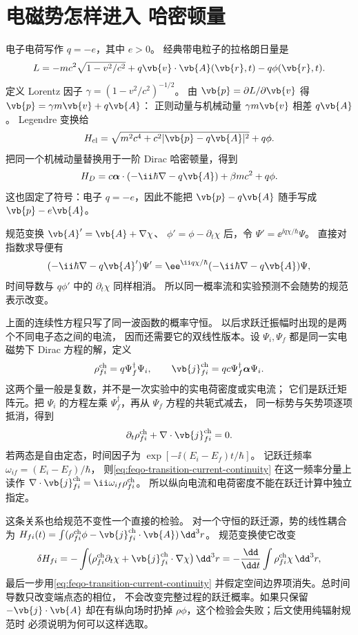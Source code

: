 \section{电磁势怎样进入 哈密顿量}
\label{sec:feqo-minimal-coupling}

电子电荷写作 \(q=-e\)，其中 \(e>0\)。
经典带电粒子的拉格朗日量是
\[
L=-mc^2\sqrt{1-v^2/c^2}
+q\vb{v}\cdot\vb{A}(\vb{r},t)-q\phi(\vb{r},t).
\]
定义 Lorentz 因子
\(\gamma=(1-v^2/c^2)^{-1/2}\)。
由 \(\vb{p}=\partial L/\partial\vb{v}\) 得
\(\vb{p}=\gamma m\vb{v}+q\vb{A}\)：
正则动量与机械动量 \(\gamma m\vb{v}\) 相差 \(q\vb{A}\)。
Legendre 变换给
\[
H_{\rm cl}
=\sqrt{m^2c^4+c^2|\vb{p}-q\vb{A}|^2}+q\phi.
\]
把同一个机械动量替换用于一阶 Dirac 哈密顿量，得到
\begin{equation}
H_D=c\boldsymbol\alpha\cdot
(-\ii\hbar\nabla-q\vb{A})+\beta mc^2+q\phi .
\label{eq:feqo-minimal-coupling}
\end{equation}
这也固定了符号：电子 \(q=-e\)，因此不能把
\(\vb{p}-q\vb{A}\) 随手写成 \(\vb{p}-e\vb{A}\)。

规范变换
\(\vb{A}'=\vb{A}+\nabla\chi\)、
\(\phi'=\phi-\partial_t\chi\) 后，令
\(\Psi'=\ee^{\ii q\chi/\hbar}\Psi\)。
直接对指数求导便有
\[
(-\ii\hbar\nabla-q\vb{A}')\Psi'
=\ee^{\ii q\chi/\hbar}
(-\ii\hbar\nabla-q\vb{A})\Psi,
\]
时间导数与 \(q\phi'\) 中的 \(\partial_t\chi\) 同样相消。
所以同一概率流和实验预测不会随势的规范表示改变。

上面的连续性方程只写了同一波函数的概率守恒。
以后求跃迁振幅时出现的是两个不同电子态之间的电流，
因而还需要它的双线性版本。设 \(\Psi_i,\Psi_f\)
都是同一实电磁势下 Dirac 方程的解，定义
\[
\rho_{fi}^{\rm ch}=q\Psi_f^\dagger\Psi_i,\qquad
\vb{j}_{fi}^{\rm ch}=qc\Psi_f^\dagger
\boldsymbol\alpha\Psi_i .
\]
这两个量一般是复数，并不是一次实验中的实电荷密度或实电流；
它们是跃迁矩阵元。把 \(\Psi_i\) 的方程左乘
\(\Psi_f^\dagger\)，再从 \(\Psi_f\) 方程的共轭式减去，
同一标势与矢势项逐项抵消，得到
\begin{equation}
\partial_t\rho_{fi}^{\rm ch}
+\nabla\cdot\vb{j}_{fi}^{\rm ch}=0 .
\label{eq:feqo-transition-current-continuity}
\end{equation}
若两态是自由定态，时间因子为
\(\exp[-\ii(E_i-E_f)t/\hbar]\)。
记跃迁频率 \(\omega_{if}=(E_i-E_f)/\hbar\)，
则\cref{eq:feqo-transition-current-continuity}
在这一频率分量上读作
\(\nabla\cdot\vb{j}_{fi}^{\rm ch}
=\ii\omega_{if}\rho_{fi}^{\rm ch}\)。
所以纵向电流和电荷密度不能在跃迁计算中独立指定。

这条关系也给规范不变性一个直接的检验。
对一个守恒的跃迁源，势的线性耦合为
\(H_{fi}(t)=\int(\rho_{fi}^{\rm ch}\phi
-\vb{j}_{fi}^{\rm ch}\cdot\vb{A})\,\dd^3r\)。
规范变换使它改变
\[
\delta H_{fi}
=-\int\!\bigl(\rho_{fi}^{\rm ch}\partial_t\chi
+\vb{j}_{fi}^{\rm ch}\cdot\nabla\chi\bigr)\,\dd^3r
=-\frac{\dd}{\dd t}
\int\rho_{fi}^{\rm ch}\chi\,\dd^3r ,
\]
最后一步用\cref{eq:feqo-transition-current-continuity}
并假定空间边界项消失。总时间导数只改变端点态的相位，
不会改变完整过程的跃迁概率。如果只保留
\(-\vb{j}\cdot\vb{A}\) 却在有纵向场时扔掉
\(\rho\phi\)，这个检验会失败；后文使用纯辐射规范时
必须说明为何可以这样选取。

